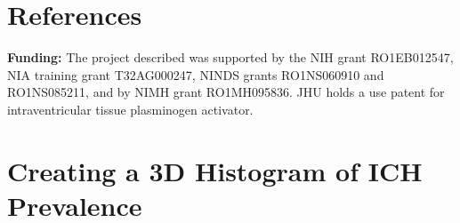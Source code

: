 \documentclass[final]{beamer}\usepackage[]{graphicx}\usepackage[]{color}
\begin{document}
\begin{frame}[fragile]
\begin{multicols}{2}


\section{References}
\setlength\bibitemsep{0pt}
\printbibliography[heading=none]\vspace*{-0.5cm}


{\small {\bf \small Funding: } The project described was supported by the  NIH grant RO1EB012547, NIA training grant T32AG000247, NINDS grants RO1NS060910 and RO1NS085211, and by NIMH grant RO1MH095836. JHU holds a use patent for intraventricular tissue plasminogen activator.}


\vfill
\columnbreak

\section{Creating a 3D Histogram of ICH Prevalence}
\vspace*{-.5cm}


\end{multicols}
\end{frame}
\end{document}
